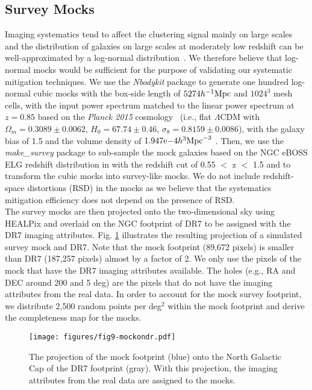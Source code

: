 \subsection{Survey Mocks}\label{subsec:surveymocks}
Imaging systematics tend to affect the clustering signal mainly on large scales \citep{myers2007clustering, huterer2013calibration} and the distribution of galaxies on large scales at moderately low redshift can be well-approximated by a log-normal distribution~\citep{1991MNRAS.248....1C}. We therefore believe that log-normal mocks would be sufficient for the purpose of validating our systematic mitigation techniques. We use the \textit{Nbodykit} package \citep{hand2017nbodykit} to generate one hundred log-normal cubic mocks with the box-side length of $5274 h^{-1}{\rm Mpc}$ and $1024^3$ mesh cells, with the input power spectrum matched to the linear power spectrum  at $z=0.85$ based on the \textit{Planck 2015} cosmology~\citep{ade2016planck} (i.e., flat $\Lambda$CDM with $\Omega_m=0.3089 \pm 0.0062$, $H_{0}=67.74 \pm 0.46$, $\sigma_8 = 0.8159 \pm 0.0086$), with the galaxy bias of 1.5 and the volume density of $1.947\mathrm{e}{-4}h^{3}{\rm Mpc}^{-3}$ \citep[see e.g.][]{Raichoor2017MNRAS.471.3955R}. Then, we use the \textit{make\_survey} package \citep{white2013mock} to sub-sample the mock galaxies based on the NGC eBOSS ELG redshift distribution in \citet{Raichoor2017MNRAS.471.3955R} with the redshift cut of  0.55 $<$ z $<$ 1.5 and to transform the cubic mocks into survey-like mocks. We do not include redshift-space distortions (RSD) in the mocks as we believe that the systematics mitigation efficiency does not depend on  the presence of RSD.\\

The survey mocks are then projected onto the two-dimensional sky using HEALPix and overlaid on the NGC footprint of DR7 to be assigned with the DR7 imaging attributes. Fig. \ref{fig:mock_on_dr} illustrates the resulting projection of a simulated survey mock and DR7. Note that the mock footprint (89,672 pixels) is smaller than DR7 (187,257 pixels) almost by a factor of 2. We only use the pixels of the mock that have the DR7 imaging attributes available. The holes (e.g., RA and DEC around 200 and 5 deg) are the pixels that do not have the imaging attributes from the real data. In order to account for the mock survey footprint, we distribute 2,500 random points per deg$^{2}$ within the mock footprint and derive the completeness map for the mocks.


\begin{figure}
    \centering
    \texttt{[image: figures/fig9-mockondr.pdf]}
    \caption{The projection of the mock footprint (blue) onto the North Galactic Cap of the DR7 footprint (gray). With this projection, the imaging attributes from the real data are assigned to the mocks.}
    \label{fig:mock_on_dr}
\end{figure}


